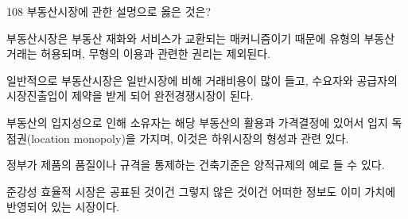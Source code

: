 \begin{question}{108}
부동산시장에 관한 설명으로 옳은 것은?
\begin{choices}
  \item 부동산시장은 부동산 재화와 서비스가 교환되는 매커니즘이기 때문에 유형의 부동산 거래는 허용되며, 무형의 이용과 관련한 권리는 제외된다.
  \item 일반적으로 부동산시장은 일반시장에 비해 거래비용이 많이 들고, 수요자와 공급자의 시장진출입이 제약을 받게 되어 완전경쟁시장이 된다.
  \item 부동산의 입지성으로 인해 소유자는 해당 부동산의 활용과 가격결정에 있어서 입지 독점권(location monopoly)을 가지며, 이것은 하위시장의 형성과 관련 있다.
  \item 정부가 제품의 품질이나 규격을 통제하는 건축기준은 양적규제의 예로 들 수 있다.
  \item 준강성 효율적 시장은 공표된 것이건 그렇지 않은 것이건 어떠한 정보도 이미 가치에 반영되어 있는 시장이다.
\end{choices}
\end{question}

